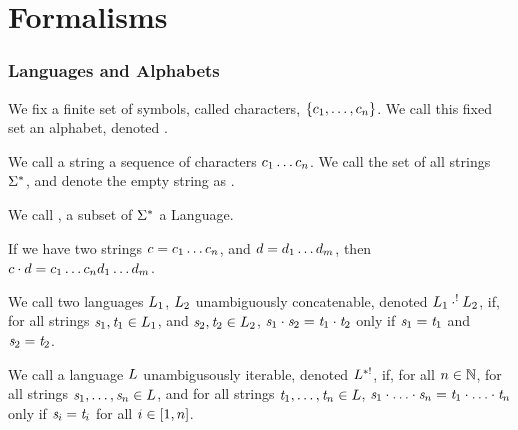 \section{Formalisms}

\subsubsection{Languages and Alphabets}
\begin{definition}
We fix a finite set of symbols, called characters, $\{c_1,\ldots,c_n\}$.
We call this fixed set an alphabet, denoted \Alphabet{}.
\end{definition}

\begin{definition}
We call a string a sequence of characters $c_1\ldots c_n$.
We call the set of all strings $\Sigma^*$, and denote the empty string as \EmptyString{}.
\end{definition}

\begin{definition}
We call \Language{}, a subset of $\Sigma^*$ a Language.
\end{definition}

\begin{definition}
If we have two strings $c=c_1\ldots c_n$,
and $d=d_1\ldots d_m$,
then $c\cdot d=c_1\ldots c_nd_1\ldots d_m$.
\end{definition}

\begin{definition}
We call two languages $L_1$, $L_2$ unambiguously concatenable,
denoted $L_1 \cdot^! L_2$,
if, for all strings $\mathit{s}_1,\mathit{t}_1\in L_1$,
and $\mathit{s}_2,\mathit{t}_2\in L_2$,
$\mathit{s}_1\cdot\mathit{s}_2=\mathit{t}_1\cdot\mathit{t}_2$
only if $\mathit{s}_1=\mathit{t}_1$ and $\mathit{s}_2=\mathit{t}_2$.
\end{definition}

\begin{definition}
We call a language $L$ unambigusously iterable,
denoted $L{}^{*!}$,
if, for all $n\in\mathbb{N}$, for all strings $\mathit{s}_1,\ldots,\mathit{s}_n\in L$,
and for all strings $\mathit{t}_1,\ldots,\mathit{t}_n\in L$,
$\mathit{s}_1\cdot\ldots\cdot\mathit{s}_n=\mathit{t}_1\cdot\ldots\cdot\mathit{t}_n$
only if $\mathit{s}_i=\mathit{t}_i$ for all $i\in[1,n]$.
\end{definition}

